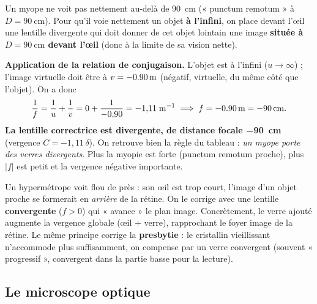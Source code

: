 \documentclass[11pt,a4paper]{article}
\begin{document}
\begin{exemple}
Un myope ne voit pas nettement au-delà de \SI{90}{\centi\metre} (« punctum remotum » à
$D=\SI{90}{\centi\metre}$). Pour qu'il voie nettement un objet \textbf{à l'infini}, on place devant
l'œil une lentille divergente qui doit donner de cet objet lointain une image \textbf{située à
$D=\SI{90}{\centi\metre}$ devant l'œil} (donc à la limite de sa vision nette).

\smallskip
\textbf{Application de la relation de conjugaison.} L'objet est à l'infini ($u\to\infty$) ; l'image
virtuelle doit être à $v=-\SI{0{,}90}{\metre}$ (négatif, virtuelle, du même côté que l'objet). On a
donc
\[ \frac{1}{f}=\frac{1}{u}+\frac{1}{v}=0+\frac{1}{-0{,}90}=-1{,}11\;\si{\per\metre}
   \;\Longrightarrow\; f=-\SI{0{,}90}{\metre}=\SI{-90}{\centi\metre}. \]
\textbf{La lentille correctrice est divergente, de distance focale \SI{-90}{\centi\metre}}
(vergence $C=-1{,}11\,\delta$). On retrouve bien la règle du tableau : \emph{un myope porte des
verres divergents}. Plus la myopie est forte (punctum remotum proche), plus $|f|$ est petit et la
vergence négative importante.
\end{exemple}

\begin{exemple}
Un hypermétrope voit flou de près : son œil est trop court, l'image d'un objet proche se formerait en
\emph{arrière} de la rétine. On le corrige avec une lentille \textbf{convergente} ($f>0$) qui
« avance » le plan image. Concrètement, le verre ajouté augmente la vergence globale (œil $+$ verre),
rapprochant le foyer image de la rétine. Le même principe corrige la \textbf{presbytie} : le
cristallin vieillissant n'accommode plus suffisamment, on compense par un verre convergent (souvent
« progressif », convergent dans la partie basse pour la lecture).
\end{exemple}

\subsection{Le microscope optique}
\end{document}
